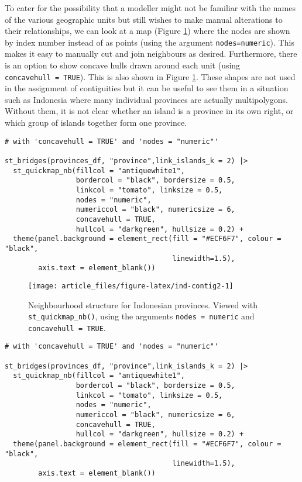 To cater for the possibility that a modeller might not be familiar with the names of the various geographic units but still wishes to make manual alterations to their relationships, we can look at a map (Figure \ref{fig:ind-contig2}) where the nodes are shown by
index number instead of as points (using the argument \texttt{nodes=\textquotesingle{}numeric\textquotesingle{}}). This makes it easy to manually cut
and join neighbours as desired. Furthermore, there is an option to
show concave hulls drawn around each unit (using \texttt{concavehull\ =\ TRUE}). This is also shown in Figure \ref{fig:ind-contig2}. These shapes are not used in the assignment of contiguities but it can be useful to see them in a situation such as Indonesia where many individual provinces are actually multipolygons. Without them, it is not clear whether an island is a province in its own right, or which group of islands together form one province.



\begin{verbatim}
# with 'concavehull = TRUE' and 'nodes = "numeric"'

st_bridges(provinces_df, "province",link_islands_k = 2) |> 
  st_quickmap_nb(fillcol = "antiquewhite1", 
                 bordercol = "black", bordersize = 0.5, 
                 linkcol = "tomato", linksize = 0.5, 
                 nodes = "numeric", 
                 numericcol = "black", numericsize = 6, 
                 concavehull = TRUE, 
                 hullcol = "darkgreen", hullsize = 0.2) + 
  theme(panel.background = element_rect(fill = "#ECF6F7", colour = "black", 
                                        linewidth=1.5),
        axis.text = element_blank())
\end{verbatim}

\begin{figure}

{\centering \texttt{[image: article\_files/figure-latex/ind-contig2-1]} 

}

\caption{Neighbourhood structure for Indonesian provinces. Viewed with \texttt{st\_quickmap\_nb()}, using the arguments \texttt{nodes\ =\ \textquotesingle{}numeric\textquotesingle{}} and \texttt{concavehull\ =\ TRUE}.}\label{fig:ind-contig2}
\end{figure}

\begin{verbatim}
# with 'concavehull = TRUE' and 'nodes = "numeric"'

st_bridges(provinces_df, "province",link_islands_k = 2) |> 
  st_quickmap_nb(fillcol = "antiquewhite1", 
                 bordercol = "black", bordersize = 0.5, 
                 linkcol = "tomato", linksize = 0.5, 
                 nodes = "numeric", 
                 numericcol = "black", numericsize = 6, 
                 concavehull = TRUE, 
                 hullcol = "darkgreen", hullsize = 0.2) + 
  theme(panel.background = element_rect(fill = "#ECF6F7", colour = "black", 
                                        linewidth=1.5),
        axis.text = element_blank())
\end{verbatim}

